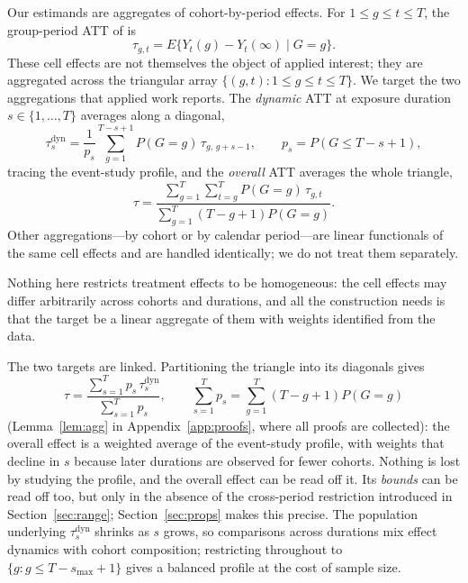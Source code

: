 \documentclass[12pt]{article}
\theoremstyle{remark}
\begin{document}
Our estimands are aggregates of cohort-by-period effects. For $1 \le g \le t \le T$,
the group-period ATT of \citet{callaway2021difference} is
\begin{equation}
\tau_{g,t} = E\{Y_t(g) - Y_t(\infty) \mid G = g\}.
\label{eq:cellatt}
\end{equation}
These cell effects are not themselves the object of applied interest; they are aggregated
across the triangular array $\{(g,t) : 1 \le g \le t \le T\}$. We target the two
aggregations that applied work reports. The \emph{dynamic} ATT at exposure duration
$s \in \{1, \ldots, T\}$ averages along a diagonal,
\begin{equation}
\tau^{\mathrm{dyn}}_s
= \frac{1}{p_s}\sum_{g=1}^{T-s+1} P(G{=}g)\,\tau_{g,\,g+s-1},
\qquad p_s = P(G \le T{-}s{+}1),
\label{eq:dyn}
\end{equation}
tracing the event-study profile, and the \emph{overall} ATT averages the whole triangle,
\begin{equation}
\tau = \frac{\sum_{g=1}^{T}\sum_{t=g}^{T} P(G{=}g)\,\tau_{g,t}}
            {\sum_{g=1}^{T}(T{-}g{+}1)P(G{=}g)}.
\label{eq:overall}
\end{equation}
Other aggregations---by cohort or by calendar period---are linear functionals of the same
cell effects and are handled identically; we do not treat them separately.

Nothing here restricts treatment effects to be homogeneous: the cell effects may differ
arbitrarily across cohorts and durations, and all the construction needs is that the target
be a linear aggregate of them with weights identified from the data.

The two targets are linked. Partitioning the triangle into its diagonals gives
\begin{equation}
\tau = \frac{\sum_{s=1}^{T} p_s\,\tau^{\mathrm{dyn}}_s}{\sum_{s=1}^{T} p_s},
\qquad
\sum_{s=1}^{T} p_s = \sum_{g=1}^{T}(T{-}g{+}1)P(G{=}g)
\label{eq:agg}
\end{equation}
(Lemma~\ref{lem:agg} in Appendix~\ref{app:proofs}, where all proofs are collected): the
overall effect is a weighted average of the event-study profile, with weights that decline
in $s$ because later durations are observed for fewer cohorts. Nothing is lost by studying
the profile, and the overall effect can be read off it. Its \emph{bounds} can be read off
too, but only in the absence of the cross-period restriction introduced in
Section~\ref{sec:range}; Section~\ref{sec:props} makes this precise. The population underlying
$\tau^{\mathrm{dyn}}_s$ shrinks as $s$ grows, so comparisons across durations mix effect
dynamics with cohort composition; restricting throughout to
$\{g : g \le T - s_{\max} + 1\}$ gives a balanced profile at the cost of sample size.
\end{document}
